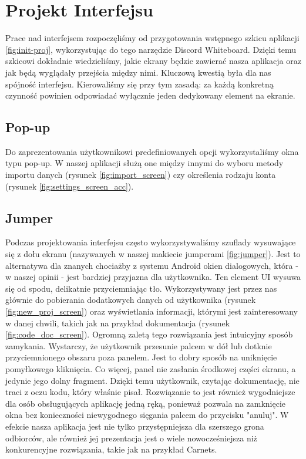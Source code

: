 \chapter{Projekt Interfejsu}
Prace nad interfejsem rozpoczęliśmy od przygotowania wstępnego szkicu aplikacji \ref{fig:init-proj}, wykorzystując do tego narzędzie Discord Whiteboard.
\newline\newline
{}
Dzięki temu szkicowi dokładnie wiedzieliśmy, jakie ekrany będzie zawierać nasza aplikacja oraz jak będą wyglądały przejścia między nimi. Kluczową kwestią była dla nas spójność interfejsu. Kierowaliśmy się przy tym zasadą: za każdą konkretną czynność powinien odpowiadać wyłącznie jeden dedykowany element na ekranie.
\section{Pop-up}
Do zaprezentowania użytkownikowi predefiniowanych opcji wykorzystaliśmy okna typu pop-up. W naszej aplikacji służą one między innymi do wyboru metody importu danych (rysunek \ref{fig:import_screen}) czy określenia rodzaju konta (rysunek \ref{fig:settings_screen_acc}).
\section{Jumper}
Podczas projektowania interfejsu często wykorzystywaliśmy szuflady wysuwające się z dołu ekranu (nazywanych w naszej makiecie jumperami \ref{fig:jumper}). Jest to alternatywa dla znanych chociażby z systemu Android okien dialogowych, która - w naszej opinii - jest bardziej przyjazna dla użytkownika.
Ten element UI wysuwa się od spodu, delikatnie przyciemniając tło. Wykorzystywany jest przez nas głównie do pobierania dodatkowych danych od użytkownika (rysunek \ref{fig:new_proj_screen}) oraz wyświetlania informacji, którymi jest zainteresowany w danej chwili, takich jak na przykład dokumentacja (rysunek \ref{fig:code_doc_screen}).
\newline\newline
Ogromną zaletą tego rozwiązania jest intuicyjny sposób zamykania. Wystarczy, że użytkownik przesunie palcem w dół lub dotknie przyciemnionego obszaru poza panelem. Jest to dobry sposób na uniknięcie pomyłkowego kliknięcia. Co więcej, panel nie zasłania środkowej części ekranu, a jedynie jego dolny fragment. Dzięki temu użytkownik, czytając dokumentację, nie traci z oczu kodu, który właśnie pisał.
\newline\newline
Rozwiązanie to jest również wygodniejsze dla osób obsługujących aplikację jedną ręką, ponieważ pozwala na zamknięcie okna bez konieczności niewygodnego sięgania palcem do przycisku "anuluj". W efekcie nasza aplikacja jest nie tylko przystępniejsza dla szerszego grona odbiorców, ale również jej prezentacja jest o wiele nowocześniejsza niż konkurencyjne rozwiązania, takie jak na przykład Carnets.
